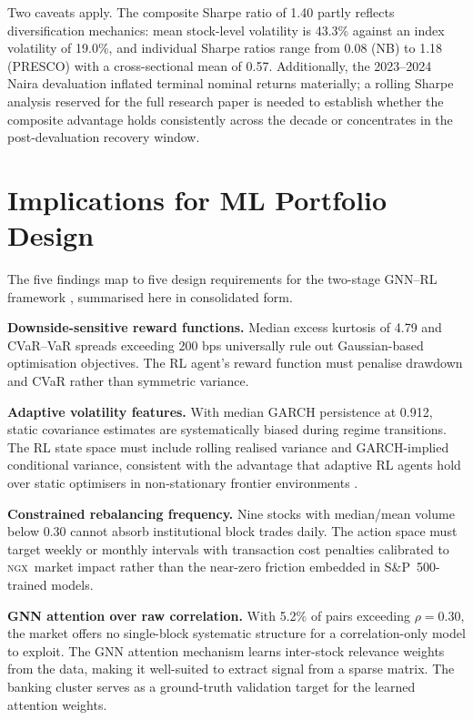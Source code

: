\documentclass[twoside,11pt]{article}
\newcommand{\ngx}{\textsc{ngx}}
\newcommand{\spidx}{S\&P~500}
\begin{document}
	Two caveats apply. The composite Sharpe ratio of 1.40 partly reflects diversification mechanics: mean stock-level volatility is 43.3\% against an index volatility of 19.0\%, and individual Sharpe	ratios range from 0.08 (NB) to 1.18 (PRESCO) with a cross-sectional
	mean of 0.57. Additionally, the 2023--2024 Naira devaluation inflated terminal nominal returns materially; a rolling Sharpe analysis reserved for the full research paper is needed to establish whether the composite advantage holds consistently across the decade or concentrates in the post-devaluation recovery window.
	
	\section{Implications for ML Portfolio Design}
	\label{sec:implications}
	
	The five findings map to five design requirements for the two-stage GNN--RL framework \citep{huang2024}, summarised here in consolidated form.
	
	\textbf{Downside-sensitive reward functions.} Median excess kurtosis of 4.79 and CVaR--VaR spreads exceeding 200 bps universally rule out Gaussian-based optimisation objectives. The RL agent's reward function
	\citep{liang2024portfolio, jiang2024drl} must penalise drawdown and CVaR rather than symmetric variance.
	
	\textbf{Adaptive volatility features.} With median GARCH persistence	at 0.912, static covariance estimates are systematically biased during regime transitions. The RL state space must include rolling realised variance and GARCH-implied conditional variance, consistent with the
	advantage that adaptive RL agents hold over static optimisers in non-stationary frontier environments \citep{ngo2023frontier}.
	
	\textbf{Constrained rebalancing frequency.} Nine stocks with median/mean volume below 0.30 cannot absorb institutional block trades daily. The action space must target weekly or monthly intervals with transaction cost penalties calibrated to \ngx\ market impact rather
	than the near-zero friction embedded in \spidx-trained models.
	
	\textbf{GNN attention over raw correlation.} With 5.2\% of pairs exceeding $\rho = 0.30$, the market offers no single-block systematic structure for a correlation-only model to exploit. The GNN attention mechanism \citep{wu2021comprehensive, sun2024graphsage} learns
	inter-stock relevance weights from the data, making it well-suited to extract signal from a sparse matrix. The banking cluster serves as a ground-truth validation target for the learned attention weights.
	
\end{document}
